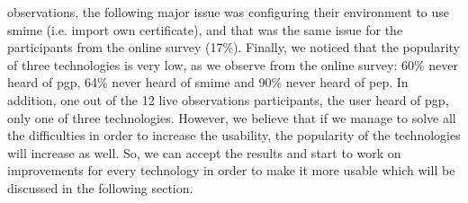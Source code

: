 observations, the following major issue was configuring their environment to use \acrshort{smime} (i.e. import own certificate), and that was the same issue for the participants from the online survey (17\%). Finally, we noticed that the popularity of three technologies is very low, as we observe from the online survey: 60\% never heard of \acrshort{pgp}, 64\% never heard of \acrshort{smime} and 90\% never
heard of \acrshort{pep}. In addition, one out of the 12 live observations participants, the user heard of \acrshort{pgp}, only one of three technologies. However, we believe that if we manage to solve all the difficulties in order to increase the usability, the popularity of the technologies will increase as well. So, we can accept the results and start to work on improvements for every technology in order to make
it more usable which will be discussed in the following section.

